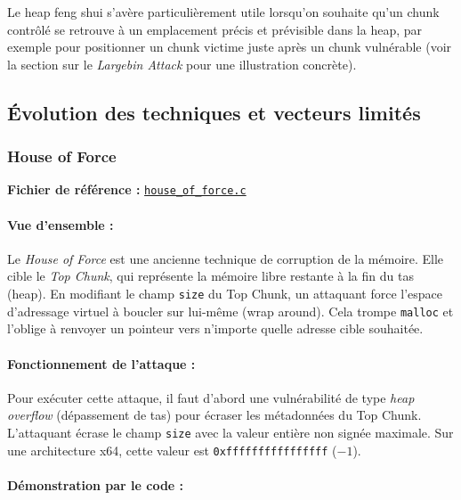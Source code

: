 Le heap feng shui s'avère particulièrement utile lorsqu'on souhaite qu'un chunk
contrôlé se retrouve à un emplacement précis et prévisible dans la heap,
par exemple pour positionner un chunk victime juste après un chunk
vulnérable (voir la section sur le \textit{Largebin Attack} pour une illustration concrète).

\subsection{Évolution des techniques et vecteurs limités}

\subsubsection{House of Force}

\noindent\textbf{Fichier de référence :} \href{https://github.com/shellphish/how2heap/blob/master/glibc_2.27/house_of_force.c}{\texttt{house\_of\_force.c}}

\paragraph{Vue d'ensemble :}
Le \textit{House of Force} est une ancienne technique de corruption de la mémoire. Elle cible le \textit{Top Chunk}, qui représente la mémoire libre restante à la fin du tas (heap). En modifiant le champ \texttt{size} du Top Chunk, un attaquant force l'espace d'adressage virtuel à boucler sur lui-même (wrap around). Cela trompe \texttt{malloc} et l'oblige à renvoyer un pointeur vers n'importe quelle adresse cible souhaitée.

\paragraph{Fonctionnement de l'attaque :}
Pour exécuter cette attaque, il faut d'abord une vulnérabilité de type \textit{heap overflow} (dépassement de tas) pour écraser les métadonnées du Top Chunk. L'attaquant écrase le champ \texttt{size} avec la valeur entière non signée maximale. Sur une architecture x64, cette valeur est \texttt{0xffffffffffffffff} ($-1$).

\paragraph{Démonstration par le code :}

